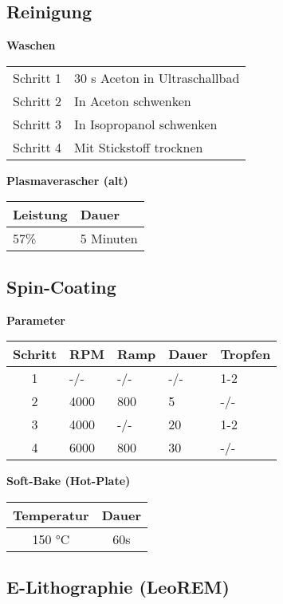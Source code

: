 \documentclass[
  paper=a4,
  ,captions=tableheading
]{scrartcl}
\begin{document}
\hypertarget{reinigung-1}{%
\subsection*{Reinigung}\label{reinigung-1}}

\textbf{Waschen}

\begin{longtable}[]{@{}ll@{}}
\toprule
\endhead
Schritt 1 & 30 s Aceton in Ultraschallbad\tabularnewline
Schritt 2 & In Aceton schwenken\tabularnewline
Schritt 3 & In Isopropanol schwenken\tabularnewline
Schritt 4 & Mit Stickstoff trocknen\tabularnewline
\bottomrule
\end{longtable}

\textbf{Plasmaverascher (alt)}

\begin{longtable}[]{@{}ll@{}}
\toprule
Leistung & Dauer\tabularnewline
\midrule
\endhead
57\% & 5 Minuten\tabularnewline
\bottomrule
\end{longtable}

\hypertarget{spin-coating-1}{%
\subsection*{Spin-Coating}\label{spin-coating-1}}

\textbf{Parameter}

\begin{longtable}[]{@{}cllll@{}}
\toprule
Schritt & RPM & Ramp & Dauer & Tropfen\tabularnewline
\midrule
\endhead
1 & -/- & -/- & -/- & 1-2\tabularnewline
2 & 4000 & 800 & 5 & -/-\tabularnewline
3 & 4000 & -/- & 20 & 1-2\tabularnewline
4 & 6000 & 800 & 30 & -/-\tabularnewline
\bottomrule
\end{longtable}

\textbf{Soft-Bake (Hot-Plate)}

\begin{longtable}[]{@{}cc@{}}
\toprule
Temperatur & Dauer\tabularnewline
\midrule
\endhead
150 °C & 60s\tabularnewline
\bottomrule
\end{longtable}

\hypertarget{e-lithographie-leorem}{%
\subsection*{E-Lithographie (LeoREM)}\label{e-lithographie-leorem}}
\end{document}
